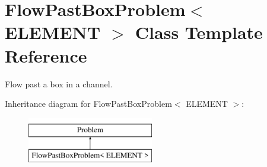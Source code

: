 \hypertarget{classFlowPastBoxProblem}{}\section{Flow\+Past\+Box\+Problem$<$ E\+L\+E\+M\+E\+NT $>$ Class Template Reference}
\label{classFlowPastBoxProblem}


Flow past a box in a channel.  


Inheritance diagram for Flow\+Past\+Box\+Problem$<$ E\+L\+E\+M\+E\+NT $>$\+:\begin{figure}[H]
\begin{center}
\leavevmode
\includegraphics[height=2.000000cm]{classFlowPastBoxProblem}
\end{center}
\end{figure}
